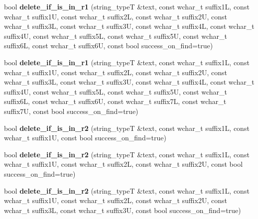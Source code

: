 \begin{DoxyCompactItemize}
\item 
\hypertarget{classstemming_1_1stem_a3fbbd1cbf322889ba4e4940d87449bb0}{bool {\bfseries delete\+\_\+if\+\_\+is\+\_\+in\+\_\+r1} (string\+\_\+type\+T \&text, const wchar\+\_\+t suffix1\+L, const wchar\+\_\+t suffix1\+U, const wchar\+\_\+t suffix2\+L, const wchar\+\_\+t suffix2\+U, const wchar\+\_\+t suffix3\+L, const wchar\+\_\+t suffix3\+U, const wchar\+\_\+t suffix4\+L, const wchar\+\_\+t suffix4\+U, const wchar\+\_\+t suffix5\+L, const wchar\+\_\+t suffix5\+U, const wchar\+\_\+t suffix6\+L, const wchar\+\_\+t suffix6\+U, const bool success\+\_\+on\+\_\+find=true)}\label{classstemming_1_1stem_a3fbbd1cbf322889ba4e4940d87449bb0}

\item 
\hypertarget{classstemming_1_1stem_acdf0457bd3392f1ac23dadef5515cebd}{bool {\bfseries delete\+\_\+if\+\_\+is\+\_\+in\+\_\+r1} (string\+\_\+type\+T \&text, const wchar\+\_\+t suffix1\+L, const wchar\+\_\+t suffix1\+U, const wchar\+\_\+t suffix2\+L, const wchar\+\_\+t suffix2\+U, const wchar\+\_\+t suffix3\+L, const wchar\+\_\+t suffix3\+U, const wchar\+\_\+t suffix4\+L, const wchar\+\_\+t suffix4\+U, const wchar\+\_\+t suffix5\+L, const wchar\+\_\+t suffix5\+U, const wchar\+\_\+t suffix6\+L, const wchar\+\_\+t suffix6\+U, const wchar\+\_\+t suffix7\+L, const wchar\+\_\+t suffix7\+U, const bool success\+\_\+on\+\_\+find=true)}\label{classstemming_1_1stem_acdf0457bd3392f1ac23dadef5515cebd}

\item 
\hypertarget{classstemming_1_1stem_a722e75e6404934da2f0c9c00ffded48a}{bool {\bfseries delete\+\_\+if\+\_\+is\+\_\+in\+\_\+r2} (string\+\_\+type\+T \&text, const wchar\+\_\+t suffix1\+L, const wchar\+\_\+t suffix1\+U, const bool success\+\_\+on\+\_\+find=true)}\label{classstemming_1_1stem_a722e75e6404934da2f0c9c00ffded48a}

\item 
\hypertarget{classstemming_1_1stem_a33bf1854d1748ba97e30ad798f828b0e}{bool {\bfseries delete\+\_\+if\+\_\+is\+\_\+in\+\_\+r2} (string\+\_\+type\+T \&text, const wchar\+\_\+t suffix1\+L, const wchar\+\_\+t suffix1\+U, const wchar\+\_\+t suffix2\+L, const wchar\+\_\+t suffix2\+U, const bool success\+\_\+on\+\_\+find=true)}\label{classstemming_1_1stem_a33bf1854d1748ba97e30ad798f828b0e}

\item 
\hypertarget{classstemming_1_1stem_ac78dd58f01ed17a41eedc33d5b2deedb}{bool {\bfseries delete\+\_\+if\+\_\+is\+\_\+in\+\_\+r2} (string\+\_\+type\+T \&text, const wchar\+\_\+t suffix1\+L, const wchar\+\_\+t suffix1\+U, const wchar\+\_\+t suffix2\+L, const wchar\+\_\+t suffix2\+U, const wchar\+\_\+t suffix3\+L, const wchar\+\_\+t suffix3\+U, const bool success\+\_\+on\+\_\+find=true)}\label{classstemming_1_1stem_ac78dd58f01ed17a41eedc33d5b2deedb}


\end{DoxyCompactItemize}
